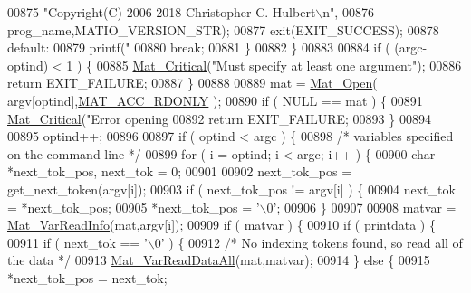 \begin{DoxyCode}
{{{{{{{{{{{{{{{{{{{{{{{{{{{{{{{{{{{{{{{{{{{{{{{{00875                        \textcolor{stringliteral}{"Copyright(C) 2006-2018 Christopher C. Hulbert\(\backslash\)n"},
00876                        prog\_name,MATIO\_VERSION\_STR);
00877                 exit(EXIT\_SUCCESS);
00878             \textcolor{keywordflow}{default}:
00879                 printf(\textcolor{stringliteral}{"%
00880                 \textcolor{keywordflow}{break};
00881         \}
00882     \}
00883 
00884     \textcolor{keywordflow}{if} ( (argc-optind) < 1 ) \{
00885         \hyperlink{group__mat__util_gaf51f2bfbb5580f575e4dd79757e2b80c}{Mat\_Critical}(\textcolor{stringliteral}{"Must specify at least one argument"});
00886         \textcolor{keywordflow}{return} EXIT\_FAILURE;
00887     \}
00888 
00889     mat = \hyperlink{group___m_a_t_gafbfedb5636a99f0ef867520c47f77d18}{Mat\_Open}( argv[optind],\hyperlink{group___m_a_t_ggaa9dcbc70f538af79bd557593ff6b5cdba8dd1457651b27ba9bea6cfba158c037c}{MAT\_ACC\_RDONLY} );
00890     \textcolor{keywordflow}{if} ( NULL == mat ) \{
00891         \hyperlink{group__mat__util_gaf51f2bfbb5580f575e4dd79757e2b80c}{Mat\_Critical}(\textcolor{stringliteral}{"Error opening %
00892         \textcolor{keywordflow}{return} EXIT\_FAILURE;
00893     \}
00894 
00895     optind++;
00896 
00897     \textcolor{keywordflow}{if} ( optind < argc ) \{
00898         \textcolor{comment}{/* variables specified on the command line */}
00899         \textcolor{keywordflow}{for} ( i = optind; i < argc; i++ ) \{
00900             \textcolor{keywordtype}{char} *next\_tok\_pos, next\_tok = 0;
00901 
00902             next\_tok\_pos = get\_next\_token(argv[i]);
00903             \textcolor{keywordflow}{if} ( next\_tok\_pos != argv[i] ) \{
00904                 next\_tok = *next\_tok\_pos;
00905                 *next\_tok\_pos = \textcolor{charliteral}{'\(\backslash\)0'};
00906             \}
00907 
00908             matvar = \hyperlink{group___m_a_t_ga46da2e45ed96d3f1a6ec643757f2b086}{Mat\_VarReadInfo}(mat,argv[i]);
00909             \textcolor{keywordflow}{if} ( matvar ) \{
00910                 \textcolor{keywordflow}{if} ( printdata ) \{
00911                     \textcolor{keywordflow}{if} ( next\_tok == \textcolor{charliteral}{'\(\backslash\)0'} ) \{
00912                         \textcolor{comment}{/* No indexing tokens found, so read all of the data */}
00913                         \hyperlink{group___m_a_t_gaa8060d7c8e5da0aa9ee5f96e5f1eb30a}{Mat\_VarReadDataAll}(mat,matvar);
00914                     \} \textcolor{keywordflow}{else} \{
00915                         *next\_tok\_pos = next\_tok;
}}}}}}}}}}}}}}}}}}}}}}}}}}}}}}}}}}}}}}}}}}}}}}}}}}
\end{DoxyCode}
